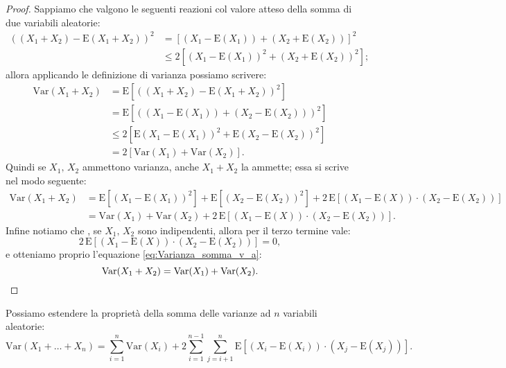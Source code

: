         \begin{proof}
            Sappiamo che valgono le seguenti reazioni col valore atteso della somma di due variabili aleatorie:
            \begin{align*}
                \left((X_1 + X_2) - \text{E}(X_1 + X_2)\right)^2 &= \left[(X_1 - \text{E}(X_1)) + (X_2 + \text{E}(X_2))\right]^2 \\
                                      &\leq 2\left[(X_1 - \text{E}(X_1))^2 + (X_2 + \text{E}(X_2))^2\right]
            ;\end{align*}
            allora applicando le definizione di varianza possiamo scrivere:
            \begin{align*}
                \text{Var}(X_1 + X_2) &= \text{E}\left[((X_1+X_2)-\text{E}(X_1+X_2))^2\right] \\
                &= \text{E}\left[((X_1 - \text{E}(X_1))+(X_2 - \text{E}(X_2)))^2\right] \\
                &\leq 2\left[\text{E}(X_1 - \text{E}(X_1))^2+\text{E}(X_2-\text{E}(X_2))^2\right] \\
                &= 2\left[\text{Var}(X_1)+\text{Var}(X_2)\right]
            .\end{align*}
            Quindi se $X_1,\,X_2$ ammettono varianza, anche $X_1+X_2$ la ammette; essa si scrive nel modo 
            seguente:
            \begin{align*}
                \text{Var}(X_1+X_2) &= \text{E}\left[(X_1 - \text{E}(X_1))^2\right] + 
                \text{E}\left[(X_2 - \text{E}(X_2))^2\right] + 
                2\, \text{E}\left[(X_1 - \text{E}(X))\cdot(X_2 - \text{E}(X_2))\right] \\
                &= \text{Var}(X_1) + \text{Var}(X_2) + 
                2\, \text{E}\left[(X_1 - \text{E}(X))\cdot(X_2 - \text{E}(X_2))\right]
            .\end{align*}
            Infine notiamo che , se $X_1,\,X_2$ sono indipendenti, allora per il terzo termine vale: \[
                2\, \text{E}\left[(X_1 - \text{E}(X))\cdot(X_2 - \text{E}(X_2))\right] = 0
            ,\] e otteniamo proprio l'equazione \eqref{eq:Varianza_somma_v_a}: \[
                \text{Var}(X_1 + X_2) = \text{Var}(X_1) + \text{Var}(X_2). \qedhere
            \]
        \end{proof}
        \begin{obsv}
            Possiamo estendere la proprietà della somma delle varianze ad $n$ variabili aleatorie:
            \begin{equation}\label{eq:Somma_varianza_v_a}
                \text{Var}(X_1+\ldots+X_n) = \sum_{i=1}^{n} \text{Var}(X_i) + 
                2 \sum_{i=1}^{n-1} \sum_{j=i+1}^{n} \text{E}\left[(X_i-\text{E}(X_i))\cdot(X_j-\text{E}(X_j))\right]
            .\end{equation}
        \end{obsv}

